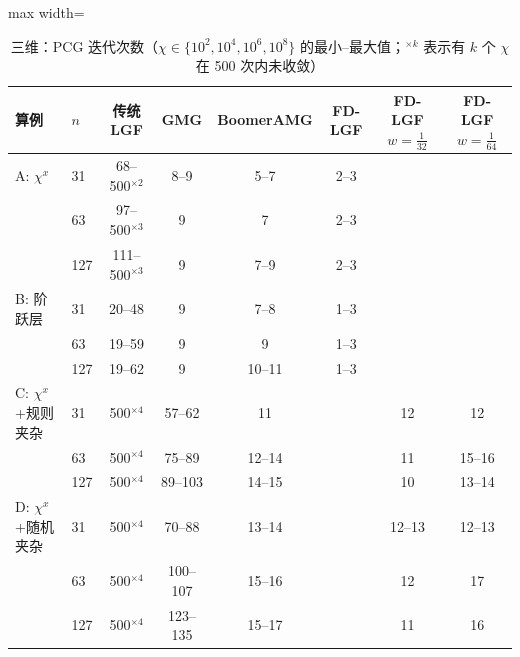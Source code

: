 \begin{table}[H]\centering\small
\caption{三维：PCG 迭代次数（$\chi\in\{10^2,10^4,10^6,10^8\}$ 的最小--最大值；$^{\times k}$ 表示有 $k$ 个 $\chi$ 在 500 次内未收敛）}\label{tab:its3d}
\begin{adjustbox}{max width=\textwidth}
\begin{tabular}{llcccccc}
\toprule
算例 & $n$ & 传统 LGF & GMG & BoomerAMG & FD-LGF & FD-LGF $w{=}\frac1{32}$ & FD-LGF $w{=}\frac1{64}$ \\
\midrule
A: $\chi^x$ & 31 & 68--500$^{\times2}$ & 8--9 & 5--7 & 2--3 &  &  \\
 & 63 & 97--500$^{\times3}$ & 9 & 7 & 2--3 &  &  \\
 & 127 & 111--500$^{\times3}$ & 9 & 7--9 & 2--3 &  &  \\
\midrule
B: 阶跃层 & 31 & 20--48 & 9 & 7--8 & 1--3 &  &  \\
 & 63 & 19--59 & 9 & 9 & 1--3 &  &  \\
 & 127 & 19--62 & 9 & 10--11 & 1--3 &  &  \\
\midrule
C: $\chi^x$+规则夹杂 & 31 & 500$^{\times4}$ & 57--62 & 11 &  & 12 & 12 \\
 & 63 & 500$^{\times4}$ & 75--89 & 12--14 &  & 11 & 15--16 \\
 & 127 & 500$^{\times4}$ & 89--103 & 14--15 &  & 10 & 13--14 \\
\midrule
D: $\chi^x$+随机夹杂 & 31 & 500$^{\times4}$ & 70--88 & 13--14 &  & 12--13 & 12--13 \\
 & 63 & 500$^{\times4}$ & 100--107 & 15--16 &  & 12 & 17 \\
 & 127 & 500$^{\times4}$ & 123--135 & 15--17 &  & 11 & 16 \\
\bottomrule
\end{tabular}
\end{adjustbox}
\end{table}


